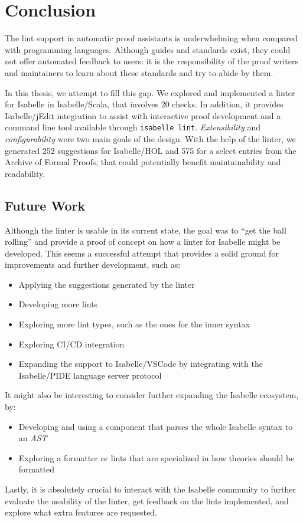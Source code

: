 \chapter{Conclusion}\label{chapter:conclusion}

The lint support in automatic proof assistants is underwhelming when compared with
programming languages. Although guides and standards exist, they could not offer
automated feedback to users: it is the responsibility of the proof writers and maintainers to
learn about these standards and try to abide by them.

In this thesis, we attempt to fill this gap. We explored and implemented a linter for 
Isabelle in Isabelle/Scala, that involves 20 checks. In addition, it provides
Isabelle/jEdit integration to assist with interactive proof development
and a command line tool available through \texttt{isabelle lint}.
\textit{Extensibility} and \textit{configurability} were two main goals of
the design. With the help of the linter, we generated 252 suggestions
for Isabelle/HOL and 575 for a select entries from the Archive of Formal
Proofs, that could potentially benefit maintainability and readability.

\section{Future Work}
Although the linter is usable in its current state, the goal was to ``get the ball
rolling'' and provide a proof of concept on how a linter for Isabelle might be
developed. This seems a successful attempt that provides a solid
ground for improvements and further development, such as:
\begin{itemize}
    \item Applying the suggestions generated by the linter
    \item Developing more lints
    \item Exploring more lint types, such as the ones for the inner syntax
    \item Exploring CI/CD integration
    \item Expanding the support to Isabelle/VSCode by integrating
    with the Isabelle/PIDE language server protocol
\end{itemize}
It might also be interesting to consider further expanding the Isabelle ecosystem, 
by:
\begin{itemize}
    \item Developing and using a component that parses the whole
    Isabelle syntax to an \textit{AST}
    \item Exploring a formatter or lints that are specialized in how theories 
    should be formatted
\end{itemize}
Lastly, it is absolutely crucial to interact with the Isabelle community to
further evaluate the usability of the linter, get feedback on the lints 
implemented, and explore what extra features are requested.